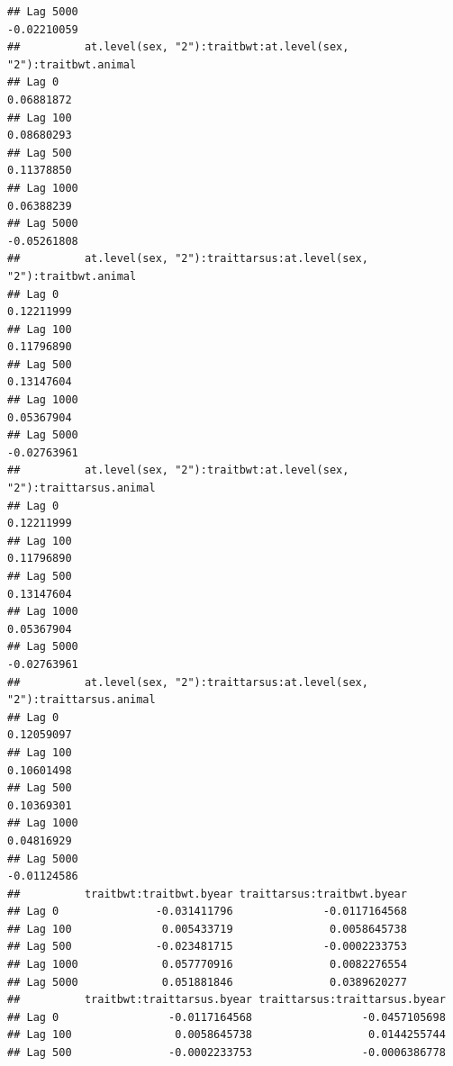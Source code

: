 \documentclass[
  12pt,
]{book}
\begin{document}
\begin{verbatim}
## Lag 5000                                                          -0.02210059
##          at.level(sex, "2"):traitbwt:at.level(sex, "2"):traitbwt.animal
## Lag 0                                                        0.06881872
## Lag 100                                                      0.08680293
## Lag 500                                                      0.11378850
## Lag 1000                                                     0.06388239
## Lag 5000                                                    -0.05261808
##          at.level(sex, "2"):traittarsus:at.level(sex, "2"):traitbwt.animal
## Lag 0                                                           0.12211999
## Lag 100                                                         0.11796890
## Lag 500                                                         0.13147604
## Lag 1000                                                        0.05367904
## Lag 5000                                                       -0.02763961
##          at.level(sex, "2"):traitbwt:at.level(sex, "2"):traittarsus.animal
## Lag 0                                                           0.12211999
## Lag 100                                                         0.11796890
## Lag 500                                                         0.13147604
## Lag 1000                                                        0.05367904
## Lag 5000                                                       -0.02763961
##          at.level(sex, "2"):traittarsus:at.level(sex, "2"):traittarsus.animal
## Lag 0                                                              0.12059097
## Lag 100                                                            0.10601498
## Lag 500                                                            0.10369301
## Lag 1000                                                           0.04816929
## Lag 5000                                                          -0.01124586
##          traitbwt:traitbwt.byear traittarsus:traitbwt.byear
## Lag 0               -0.031411796              -0.0117164568
## Lag 100              0.005433719               0.0058645738
## Lag 500             -0.023481715              -0.0002233753
## Lag 1000             0.057770916               0.0082276554
## Lag 5000             0.051881846               0.0389620277
##          traitbwt:traittarsus.byear traittarsus:traittarsus.byear
## Lag 0                 -0.0117164568                 -0.0457105698
## Lag 100                0.0058645738                  0.0144255744
## Lag 500               -0.0002233753                 -0.0006386778

\end{verbatim}
\end{document}
